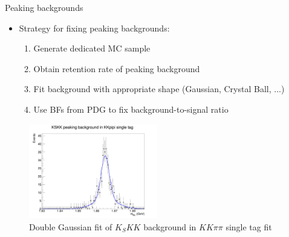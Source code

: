 \documentclass{beamer}
\begin{document}
\begin{frame}{Peaking backgrounds}
  \begin{itemize}
    \item{Strategy for fixing peaking backgrounds:}
    \begin{enumerate}
      \item{Generate dedicated MC sample}
      \item{Obtain retention rate of peaking background}
      \item{Fit background with appropriate shape (Gaussian, Crystal Ball, ...)}
      \item{Use BFs from PDG to fix background-to-signal ratio}
    \end{enumerate}
  \end{itemize}
  \begin{figure}
    \centering
    \includegraphics[width=0.50\textwidth]{Plots/KSKKtoKKpipi_Fit.png}
    \caption{Double Gaussian fit of $K_SKK$ background in $KK\pi\pi$ single tag fit}
  \end{figure}
\end{frame}
\end{document}
